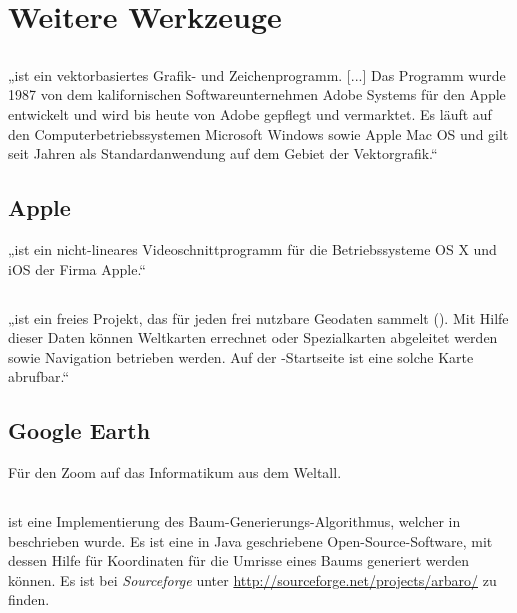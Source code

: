 \section{Weitere Werkzeuge}
	
	\subsection{\Illustrator}
	
	„\Illustrator [...] ist ein vektorbasiertes Grafik- und Zeichenprogramm. [...] Das Programm wurde 1987 von dem kalifornischen Softwareunternehmen Adobe Systems für den Apple  entwickelt und wird bis heute von Adobe gepflegt und vermarktet. Es läuft auf den Computerbetriebssystemen Microsoft Windows sowie Apple Mac OS und gilt seit Jahren als Standardanwendung auf dem Gebiet der Vektorgrafik.“ \cite{Wiki-Illustrator}
	
	\subsection{Apple \iMovie}
	
	„\iMovie ist ein nicht-lineares Videoschnittprogramm für die Betriebssysteme OS X und iOS der Firma Apple.“ \cite{Wiki-iMovie}
	
	\subsection{\OSM}
	
	„\OSM ist ein freies Projekt, das für jeden frei nutzbare Geodaten sammelt (). Mit Hilfe dieser Daten können Weltkarten errechnet oder Spezialkarten abgeleitet werden sowie Navigation betrieben werden. Auf der \OSM-Startseite ist eine solche Karte abrufbar.“ \cite{Wiki-OSM}
	
	\subsection{Google Earth}
	
	Für den Zoom auf das Informatikum aus dem Weltall.
	
	\subsection{\Arbaro}
	
	\Arbaro ist eine Implementierung des Baum-Generierungs-Algorithmus, welcher in \cite{Weber+95} beschrieben wurde. Es ist eine in Java geschriebene Open-Source-Software, mit dessen Hilfe für \Povray Koordinaten für die Umrisse eines Baums generiert werden können. Es ist bei \textit{Sourceforge} unter \url{http://sourceforge.net/projects/arbaro/} zu finden.